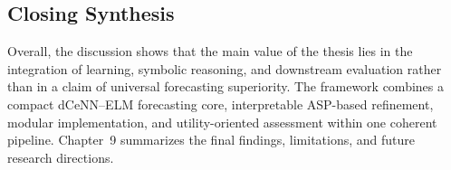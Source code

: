 \subsection{Closing Synthesis}

Overall, the discussion shows that the main value of the thesis lies in the integration of learning, symbolic reasoning, and downstream evaluation rather than in a claim of universal forecasting superiority. The framework combines a compact dCeNN--ELM forecasting core, interpretable ASP-based refinement, modular implementation, and utility-oriented assessment within one coherent pipeline. Chapter~9 summarizes the final findings, limitations, and future research directions.